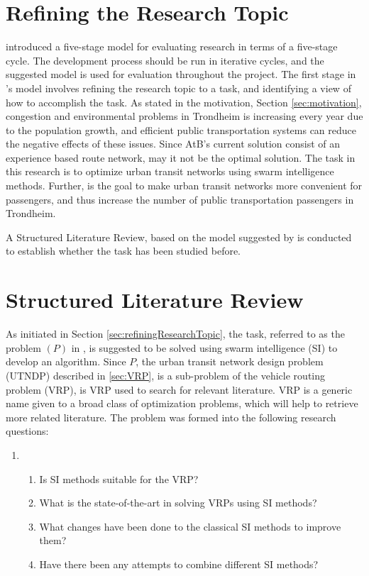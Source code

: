 
\section{Refining the Research Topic}
\label{sec:refiningResearchTopic}
\citet{cohen88} introduced a five-stage model for evaluating research in terms of a five-stage cycle. The development process should be run in iterative cycles, and the suggested model is used for evaluation throughout the project. The first stage in \citet{cohen88}'s model involves refining the research topic to a task, and identifying a view of how to accomplish the task. %
As stated in the motivation, Section \vref{sec:motivation}, congestion and environmental problems in Trondheim is increasing every year due to the population growth\citep{website:miljopakken}, and efficient public transportation systems can reduce the negative effects of these issues. Since AtB's\citep{website:atb} current solution consist of an experience based route network, may it not be the optimal solution. The task in this research is to optimize urban transit networks using swarm intelligence methods. Further, is the goal to make urban transit networks more convenient for passengers, and thus increase the number of public transportation passengers in Trondheim. 

A Structured Literature Review, based on the model suggested by \citet{kofod2014} is conducted to establish whether the task has been studied before. 

\section{Structured Literature Review}
\label{sec:structuredLiteratureReview}

As initiated in Section \vref{sec:refiningResearchTopic}, the task, referred to as the problem $(P)$ in \citet{kofod2014}, is suggested to be solved using swarm intelligence (SI) to develop an algorithm. Since $P$, the urban transit network design problem (UTNDP) described in \vref{sec:VRP}, is a sub-problem of the vehicle routing problem (VRP), is VRP used to search for relevant literature. VRP is a generic name given to a broad class of optimization problems, which will help to retrieve more related literature. The problem was formed into the following research questions:

\begin{enumerate}[label=\textbf{\arabic*})]
\item 
    \begin{enumerate}
    \item Is SI methods suitable for the VRP?
    \item What is the state-of-the-art in solving VRPs using SI methods?
    \item What changes have been done to the classical SI methods to improve them?
    \item Have there been any attempts to combine different SI methods?
    \end{enumerate}
\end{enumerate}

